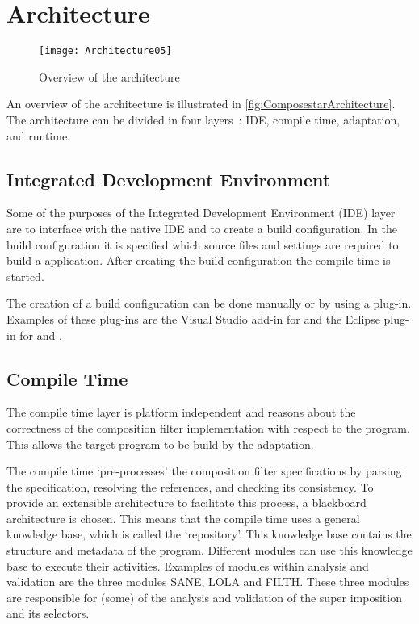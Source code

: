 \section{\Compose* Architecture}
\label{sec:TheComposestarArchitecture}
\begin{figure}
  \centering
  \texttt{[image: Architecture05]}
  \caption[Overview of the \Compose* architecture]{%
    Overview of the \Compose* architecture}
  \label{fig:ComposestarArchitecture}
\end{figure}
An overview of the \Compose* architecture is illustrated in \autoref{fig:ComposestarArchitecture}.
The \Compose* architecture can be divided in four layers~\cite{Nagy2006}: IDE, compile time, adaptation, and runtime. 

\subsection{Integrated Development Environment}
Some of the purposes of the Integrated Development Environment (IDE) layer are to interface with the native IDE and to create a build configuration.
In the build configuration it is specified which source files and settings are required to build a \Compose* application.
After creating the build configuration the compile time is started.

The creation of a build configuration can be done manually or by using a plug-in.
Examples of these plug-ins are the Visual Studio add-in for \Compose*[.NET] and the Eclipse plug-in for \Compose*[J] and \Compose*[C].

\subsection{Compile Time}
The compile time layer is platform independent and reasons about the correctness of the composition filter implementation with respect to the program. This allows the target program to be build by the adaptation.

The compile time `pre-processes' the composition filter specifications by parsing the specification, resolving the references, and checking its consistency.
To provide an extensible architecture to facilitate this process, a blackboard architecture is chosen.
This means that the compile time uses a general knowledge base, which is called the `repository'.
This knowledge base contains the structure and metadata of the program. Different modules can use this knowledge base to execute their activities.
Examples of modules within analysis and validation are the three modules SANE, LOLA and FILTH.
These three modules are responsible for (some) of the analysis and validation of the super imposition and its selectors.


